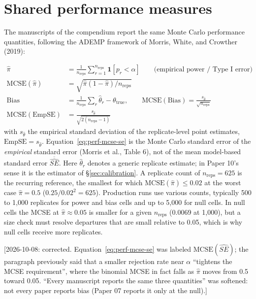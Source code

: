 \documentclass[11pt]{article}
\newcommand{\note}[1]{\textcolor{blue!60!black}{\small [#1]}}
\begin{document}
\section{Shared performance measures}
\label{sec:performance}

The manuscripts of the compendium report the same Monte Carlo
performance quantities, following the ADEMP framework of Morris,
White, and Crowther (2019):

\begin{align}
\hat\pi &= \frac{1}{n_{\mathrm{reps}}}\sum_{r=1}^{n_{\mathrm{reps}}}
  \mathbf 1[p_r < \alpha] \qquad \text{(empirical power / Type~I error)}
  \label{eq:perf-power} \\
\mathrm{MCSE}(\hat\pi) &= \sqrt{\hat\pi(1-\hat\pi)/n_{\mathrm{reps}}}
  \label{eq:perf-mcse-power} \\
\mathrm{Bias} &= \frac{1}{n_{\mathrm{reps}}}\sum_r \hat\theta_r -
  \theta_{\mathrm{true}}, \qquad \mathrm{MCSE(Bias)} =
  \frac{s_{\hat\theta}}{\sqrt{n_{\mathrm{reps}}}}
  \label{eq:perf-bias} \\
\mathrm{MCSE}(\mathrm{EmpSE}) &= \frac{s_{\hat\theta}}
  {\sqrt{2(n_{\mathrm{reps}}-1)}}
  \label{eq:perf-mcse-se}
\end{align}
with $s_{\hat\theta}$ the empirical standard deviation of the
replicate-level point estimates, $\mathrm{EmpSE} = s_{\hat\theta}$.
Equation~\eqref{eq:perf-mcse-se} is the Monte Carlo standard error of
the \emph{empirical} standard error (Morris et al., Table 6), not of
the mean model-based standard error $\overline{\widehat{SE}}$. Here
$\hat\theta_r$ denotes a generic replicate estimate; in Paper 10's
sense it is the estimator of \S\ref{sec:calibration}. A replicate count
of $n_{\mathrm{reps}} = 625$ is the recurring reference, the smallest
for which $\mathrm{MCSE}(\hat\pi) \le 0.02$ at the worst case
$\hat\pi=0.5$ ($0.25/0.02^2 = 625$). Production runs use various
counts, typically 500 to 1{,}000 replicates for power and bias cells
and up to 5{,}000 for null cells. In null cells the MCSE at
$\hat\pi \approx 0.05$ is smaller for a given $n_{\mathrm{reps}}$
(0.0069 at 1{,}000), but a size check must resolve departures that
are small relative to 0.05, which is why null cells receive more
replicates.

\note{2026-10-08: corrected. Equation~\eqref{eq:perf-mcse-se} was
labeled $\mathrm{MCSE}(\widehat{SE})$; the paragraph previously said
that a smaller rejection rate near $\alpha$ ``tightens the MCSE
requirement'', where the binomial MCSE in fact falls as $\hat\pi$
moves from 0.5 toward 0.05. ``Every manuscript reports the same three
quantities'' was softened: not every paper reports bias (Paper 07
reports it only at the null).}
\end{document}
